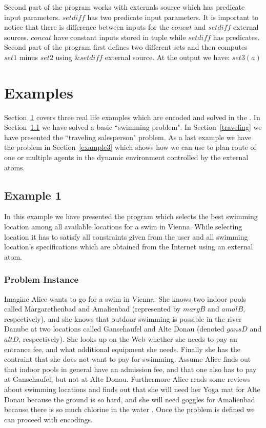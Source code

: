 \documentclass[14pt,a4paper, titlepage]{article}
\begin{document}
Second part of the program works with externals source 
which has predicate input parameters. $\mathit{setdiff}$ 
has two predicate input parameters. It is important to 
notice that there is difference between inputs for the 
$\mathit{concat}$ and $\mathit{setdiff}$ external sources. 
$\mathit{concat}$ have constant inputs stored in tuple 
while $\mathit{setdiff}$ has predicates. Second part of the 
program first defines two different sets and then computes 
$\mathit{set1}$ minus $\mathit{set2}$ using 
$\mathit{\&setdiff}$ external source. At the output we 
have: $\mathit{set3}(a)$ 

\section{Examples}
\label{sec:examples}
Section~\ref{sec:examples} covers three real life examples  
which are encoded and solved in the \dlvhex{}. In Section~\ref{example1} we have solved a basic ``swimming 
problem". In Section~\ref{traveling} we have presented the ``traveling salesperson" problem. As a last example we have the problem in Section~\ref{example3} which shows how we can use \dlvhex{} to plan route of one or multiple agents in the dynamic 
environment controlled by the external atoms.

\subsection{Example 1}
\label{example1}
In this example we have presented the program which selects  
the best swimming location among all available locations 
for a swim in Vienna. While selecting location it has to 
satisfy all constraints given from the user and all swimming location's specifications which are obtained from the Internet using  
an external atom.
 
\subsubsection{Problem Instance}
Imagine Alice wants to go for a swim in Vienna. She knows 
two indoor pools called Margarethenbad and Amalienbad 
(represented by $\mathit{margB}$ and $\mathit{amalB}$, 
respectively), and she knows that outdoor swimming is 
possible in the river Danube at two locations called 
Gansehaufel and Alte Donau (denoted $\mathit{gansD}$ and 
$\mathit{altD}$, respectively). She looks up on the Web 
whether she needs to pay an entrance fee, and what 
additional equipment she needs. Finally she has the 
contraint that she does not want to pay for swimming. 
Assume Alice finds out that indoor pools in general have an 
admission fee, and that one also
has to pay at Gansehaufel, but not at Alte Donau. 
Furthermore Alice reads some reviews about swimming 
locations and finds out that she will need her Yoga mat for 
Alte Donau because the ground is so hard, and she will need 
goggles for Amalienbad because there is so much chlorine in 
the water \cite{swim}. Once the problem is defined we can 
proceed with encodings.    
\end{document}
